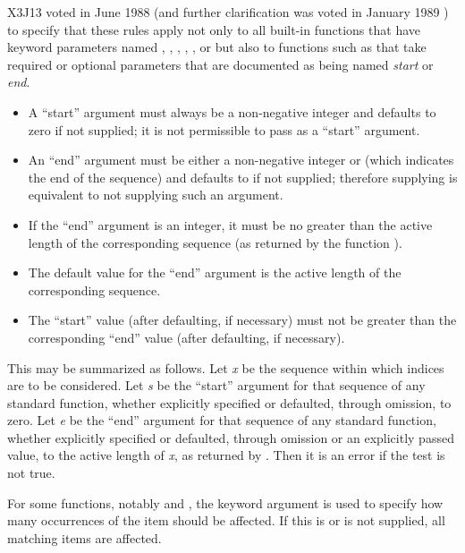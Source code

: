 \begin{newer}
X3J13 voted in June 1988 
(and further clarification was voted in January 1989
)
to specify that these rules apply not
only to all built-in functions that have keyword parameters named
, , , , ,
or  but also to functions such as 
that take required or optional parameters that are documented
as being named {\it start} or {\it end}.
\begin{itemize}
\item A ``start'' argument must always be a non-negative integer and
defaults to zero if not supplied; it is not permissible to pass 
as a ``start'' argument.
\item An ``end'' argument must be either a
non-negative integer or  (which indicates the end of the
sequence) and defaults to 
if not supplied; therefore supplying  is equivalent to
not supplying such an argument.
\item If the ``end'' argument is an integer, it must be no greater than the
active length of the corresponding sequence
(as returned by the function ).
\item The default value for the ``end'' argument is the active length
of the corresponding sequence.
\item The ``start'' value (after defaulting, if necessary) must not be greater than the
corresponding ``end'' value (after defaulting, if necessary).
\end{itemize}
This may be summarized as follows.
Let {\it x} be the sequence within which indices are to be considered.  Let {\it s} be
the ``start'' argument for that sequence of any standard function,
whether explicitly specified or defaulted, through omission, to
zero.  Let {\it e} be the ``end'' argument for that sequence
of any standard function, whether explicitly specified or defaulted, through
omission or an explicitly passed  value, to the active length of {\it x}, as
returned by .  Then it is an error if the test
is not true.
\end{newer}

For some functions, notably  and , the keyword argument
 is used to specify how many occurrences of the item should
be affected.  If this is {\false} or is not supplied, all matching items are
affected.

